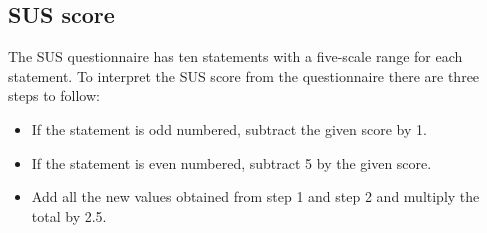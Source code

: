 \documentclass[mscthesis]{usiinfthesis}
\begin{document}
\begin{table}[!ht]
\centering
{}
\caption{Efficiency of each participant.}
\label{tab6}
\end{table}

\subsection{SUS score} %
The SUS questionnaire has ten statements with a five-scale range for each statement. To interpret the SUS score from the questionnaire there are three steps to follow:

\begin{itemize}
\item If the statement is odd numbered, subtract the given score by 1.
\item If the statement is even numbered, subtract 5 by the given score.
\item Add all the new values obtained from step 1 and step 2 and multiply the total by 2.5. 
\end{itemize}
\end{document}
